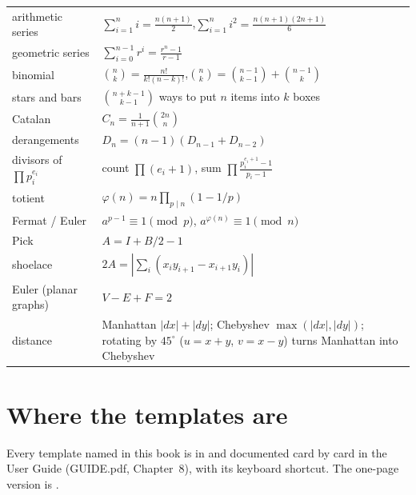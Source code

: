 \begin{center}
\begin{tabularx}{\linewidth}{>{\raggedright\arraybackslash}p{5.2cm}L}
\toprule
{} &  \\
\midrule
arithmetic series & $\sum_{i=1}^n i = \frac{n(n+1)}{2}$,\quad $\sum_{i=1}^n i^2 = \frac{n(n+1)(2n+1)}{6}$ \\
geometric series & $\sum_{i=0}^{n-1} r^i = \frac{r^n - 1}{r - 1}$ \\
binomial & $\binom nk = \frac{n!}{k!(n-k)!}$,\quad $\binom nk = \binom{n-1}{k-1} + \binom{n-1}{k}$ \\
stars and bars & $\binom{n+k-1}{k-1}$ ways to put $n$ items into $k$ boxes \\
Catalan & $C_n = \frac{1}{n+1}\binom{2n}n$ \\
derangements & $D_n = (n-1)(D_{n-1} + D_{n-2})$ \\
divisors of $\prod p_i^{e_i}$ & count $\prod(e_i + 1)$, sum $\prod\frac{p_i^{e_i+1}-1}{p_i-1}$ \\
totient & $\varphi(n) = n\prod_{p\mid n}(1 - 1/p)$ \\
Fermat / Euler & $a^{p-1} \equiv 1 \pmod p$, $a^{\varphi(n)} \equiv 1 \pmod n$ \\
Pick & $A = I + B/2 - 1$ \\
shoelace & $2A = |\sum_i (x_i y_{i+1} - x_{i+1} y_i)|$ \\
Euler (planar graphs) & $V - E + F = 2$ \\
distance & Manhattan $|dx| + |dy|$; Chebyshev $\max(|dx|, |dy|)$; rotating by $45^\circ$ ($u = x + y$, $v = x - y$) turns Manhattan into Chebyshev \\
\bottomrule
\end{tabularx}
\end{center}

\section{Where the templates are}

Every template named in this book is in  and documented card by card in the User Guide (GUIDE.pdf,
Chapter~8), with its keyboard shortcut. The one-page version is .

